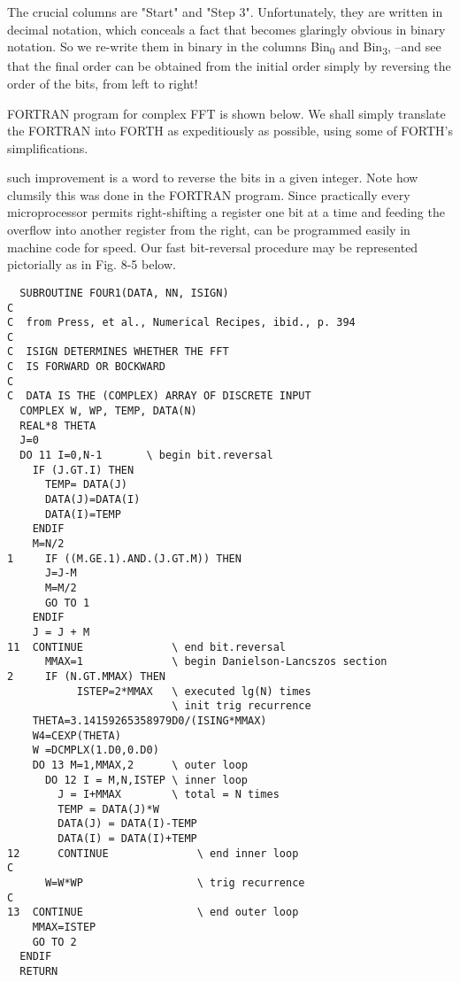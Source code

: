 The crucial columns are "Start" and "Step 3". Unfortunately, they are written in decimal notation, which conceals a fact that becomes glaringly obvious in binary notation. So we re-write them in binary in the columns Bin\textsubscript{0} and Bin\textsubscript{3}, --and see that the final order can be obtained from the initial order simply by reversing the order of the bits, from left to right!

 FORTRAN program for complex FFT is shown below. We shall simply translate the FORTRAN into FORTH as expeditiously as possible, using some of FORTH's simplifications.

 such improvement is a word to reverse the bits in a given integer. Note how clumsily this was done in the FORTRAN program. Since practically every microprocessor permits right-shifting a register one bit at a time and feeding the overflow into another register from the right,  can be programmed easily in machine code for speed. Our fast bit-reversal procedure  may be represented pictorially as in Fig. 8-5 below.

\begin{multicols}{2}
    \tiny
    \begin{verbatim}
  SUBROUTINE FOUR1(DATA, NN, ISIGN)
C
C  from Press, et al., Numerical Recipes, ibid., p. 394
C   
C  ISIGN DETERMINES WHETHER THE FFT
C  IS FORWARD OR BOCKWARD
C
C  DATA IS THE (COMPLEX) ARRAY OF DISCRETE INPUT 
  COMPLEX W, WP, TEMP, DATA(N)
  REAL*8 THETA
  J=0
  DO 11 I=0,N-1       \ begin bit.reversal
    IF (J.GT.I) THEN
      TEMP= DATA(J)
      DATA(J)=DATA(I)
      DATA(I)=TEMP
    ENDIF
    M=N/2
1     IF ((M.GE.1).AND.(J.GT.M)) THEN
      J=J-M
      M=M/2
      GO TO 1
    ENDIF
    J = J + M
11  CONTINUE              \ end bit.reversal
      MMAX=1              \ begin Danielson-Lancszos section
2     IF (N.GT.MMAX) THEN
           ISTEP=2*MMAX   \ executed lg(N) times
                          \ init trig recurrence
    THETA=3.14159265358979D0/(ISING*MMAX)
    W4=CEXP(THETA)
    W =DCMPLX(1.D0,0.D0)
    DO 13 M=1,MMAX,2      \ outer loop
      DO 12 I = M,N,ISTEP \ inner loop
        J = I+MMAX        \ total = N times
        TEMP = DATA(J)*W
        DATA(J) = DATA(I)-TEMP
        DATA(I) = DATA(I)+TEMP
12      CONTINUE              \ end inner loop
C
      W=W*WP                  \ trig recurrence
C
13  CONTINUE                  \ end outer loop
    MMAX=ISTEP
    GO TO 2
  ENDIF
  RETURN
    \end{verbatim}
\end{multicols}

